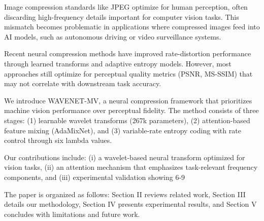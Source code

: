 Image compression standards like JPEG optimize for human perception, often discarding high-frequency details important for computer vision tasks. This mismatch becomes problematic in applications where compressed images feed into AI models, such as autonomous driving or video surveillance systems.

Recent neural compression methods have improved rate-distortion performance through learned transforms and adaptive entropy models. However, most approaches still optimize for perceptual quality metrics (PSNR, MS-SSIM) that may not correlate with downstream task accuracy.

We introduce WAVENET-MV, a neural compression framework that prioritizes machine vision performance over perceptual fidelity. The method consists of three stages: (1) learnable wavelet transforms (267k parameters), (2) attention-based feature mixing (AdaMixNet), and (3) variable-rate entropy coding with rate control through six lambda values.

Our contributions include: (i) a wavelet-based neural transform optimized for vision tasks, (ii) an attention mechanism that emphasizes task-relevant frequency components, and (iii) experimental validation showing 6-9%

The paper is organized as follows: Section II reviews related work, Section III details our methodology, Section IV presents experimental results, and Section V concludes with limitations and future work.